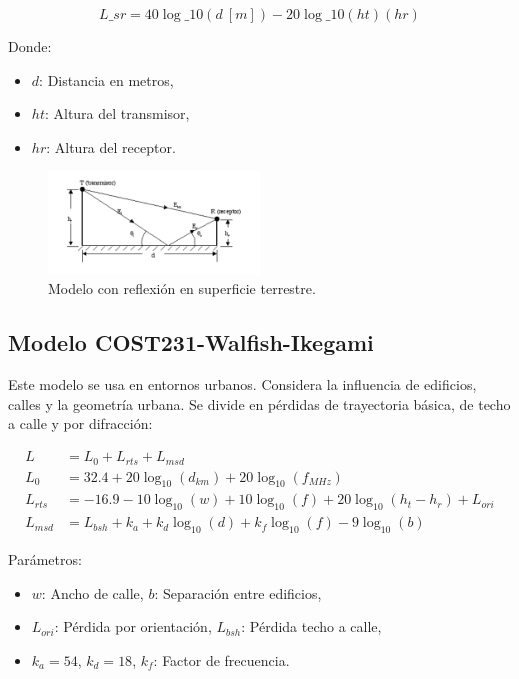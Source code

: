 \begin{equation}
L\_{sr} = 40\log\_{10}(d\ [m]) - 20\log\_{10}(ht)(hr)
\end{equation}

\noindent Donde:
\begin{itemize}
\item $d$: Distancia en metros,
\item $ht$: Altura del transmisor,
\item $hr$: Altura del receptor.
\end{itemize}

\begin{figure}[H]
\centering
\includegraphics[width=0.5\textwidth]{./img/reflejante.png}
\caption{Modelo con reflexión en superficie terrestre.}
\end{figure}

\subsection{Modelo COST231-Walfish-Ikegami}
Este modelo se usa en entornos urbanos. Considera la influencia de edificios, calles y la geometría urbana. Se divide en pérdidas de trayectoria básica, de techo a calle y por difracción:

\begin{align}
L &= L_0 + L_{rts} + L_{msd} \\
L_0 &= 32.4 + 20\log_{10}(d_{km}) + 20\log_{10}(f_{MHz}) \\
L_{rts} &= -16.9 - 10\log_{10}(w) + 10\log_{10}(f) + 20\log_{10}(h_t - h_r) + L_{ori} \\
L_{msd} &= L_{bsh} + k_a + k_d \log_{10}(d) + k_f \log_{10}(f) - 9 \log_{10}(b)
\end{align}

\noindent Parámetros:
\begin{itemize}
\item $w$: Ancho de calle, $b$: Separación entre edificios,
\item $L_{ori}$: Pérdida por orientación, $L_{bsh}$: Pérdida techo a calle,
\item $k_a = 54$, $k_d = 18$, $k_f$: Factor de frecuencia.
\end{itemize}


